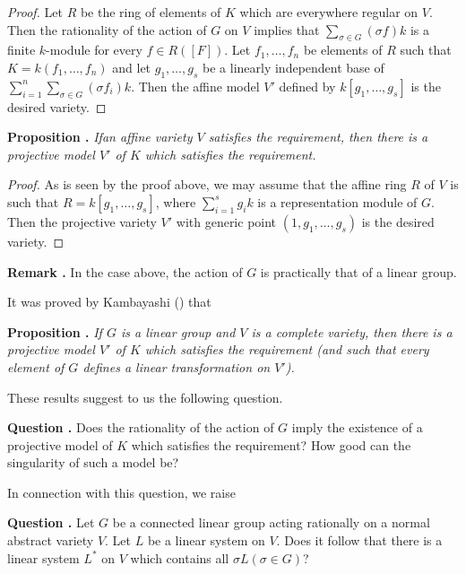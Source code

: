 \begin{proof}
Let $R$ be the ring of elements of $K$ which are everywhere regular on $V$. Then the rationality of the action of $G$ on $V$ implies that $\sum\limits_{\sigma \in G}(\sigma f)k$ is a finite $k$-module for every $f\in R([F])$. Let $f_{1},\ldots,f_{n}$ be elements of $R$ such that $K=k(f_{1},\ldots,f_{n})$ and let $g_{1},\ldots,g_{s}$ be a linearly independent base of $\sum\limits^{n}_{i=1}\sum\limits_{\sigma \in G}(\sigma f_{i})k$. Then the affine model $V'$ defined by $k[g_{1},\ldots,g_{s}]$ is the desired variety.
\end{proof}

\medskip
\noindent
{\bf Proposition .\label{art16-prop1.3}}
{\em If\pageoriginale an affine variety $V$ satisfies the requirement, then there is a projective model $V'$ of $K$ which satisfies the requirement.}

\begin{proof}
As is seen by the proof above, we may assume that the affine ring $R$ of $V$ is such that $R=k[g_{1},\ldots,g_{s}]$, where $\sum\limits^{s}_{i=1}g_{i}k$ is a representation module of $G$. Then the projective variety $V'$ with generic point $(1,g_{1},\ldots,g_{s})$ is the desired variety.
\end{proof}

\medskip
\noindent
{\bf Remark .\label{art16-rem1.4}}
In the case above, the action of $G$ is practically that of a linear group.
\smallskip

It was proved by Kambayashi (\cite{art16-key-K}) that

\medskip
\noindent
{\bf Proposition .\label{art16-prop1.5}}
{\em If $G$ is a linear group and $V$ is a complete variety, then there is a projective model $V'$ of $K$ which satisfies the requirement (and such that every element of $G$ defines a linear transformation on $V'$).}
\smallskip

These results suggest to us the following question.

\medskip
\noindent
{\bf Question .\label{art16-ques1.6}}
Does the rationality of the action of $G$ imply the existence of a projective model of $K$ which satisfies the requirement? How good can the singularity of such a model be?
\smallskip

In connection with this question, we raise

\medskip
\noindent
{\bf Question .\label{art16-ques1.7}}
Let $G$ be a connected linear group acting rationally on a normal abstract variety $V$. Let $L$ be a linear system on $V$. Does it follow that there is a linear system $L^{*}$ on $V$ which contains all $\sigma L(\sigma\in G)$?
\smallskip

